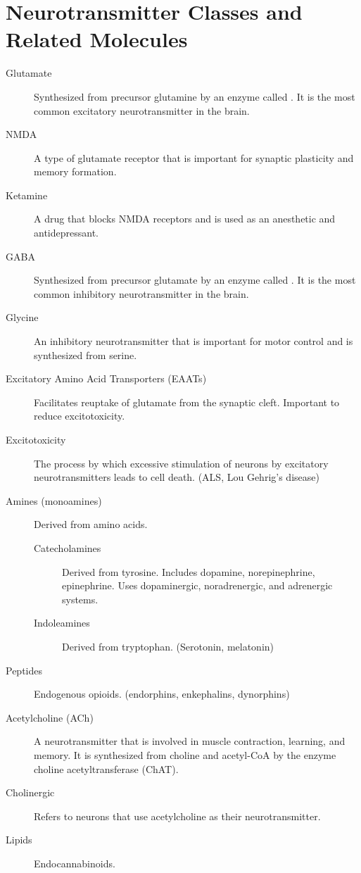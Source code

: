 \section*{Neurotransmitter Classes and Related Molecules}
\begin{description}
    \item[Glutamate] Synthesized from precursor glutamine by an enzyme called . It is the most common excitatory neurotransmitter in the brain. 
    \item[NMDA] A type of glutamate receptor that is important for synaptic plasticity and memory formation.
    \item[Ketamine] A drug that blocks NMDA receptors and is used as an anesthetic and antidepressant.
    \item[GABA] Synthesized from precursor glutamate by an enzyme called . It is the most common inhibitory neurotransmitter in the brain.
    \item[Glycine] An inhibitory neurotransmitter that is important for motor control and is synthesized from serine.
    \item[Excitatory Amino Acid Transporters (EAATs)] Facilitates reuptake of glutamate from the synaptic cleft. Important to reduce excitotoxicity.
    \item[Excitotoxicity] The process by which excessive stimulation of neurons by excitatory neurotransmitters leads to cell death. (ALS, Lou Gehrig's disease)
    \item[Amines (monoamines)]  Derived from amino acids.
        \begin{description}
            \item[Catecholamines] Derived from tyrosine. Includes dopamine, norepinephrine, epinephrine. Uses dopaminergic, noradrenergic, and adrenergic systems.
            \item[Indoleamines] Derived from tryptophan. (Serotonin, melatonin)
        \end{description}
    \item[Peptides] Endogenous opioids. (endorphins, enkephalins, dynorphins)
    \item[Acetylcholine (ACh)] A neurotransmitter that is involved in muscle contraction, learning, and memory. It is synthesized from choline and acetyl-CoA by the enzyme choline acetyltransferase (ChAT).
    \item[Cholinergic] Refers to neurons that use acetylcholine as their neurotransmitter.
    \item[Lipids] Endocannabinoids.

\end{description}
